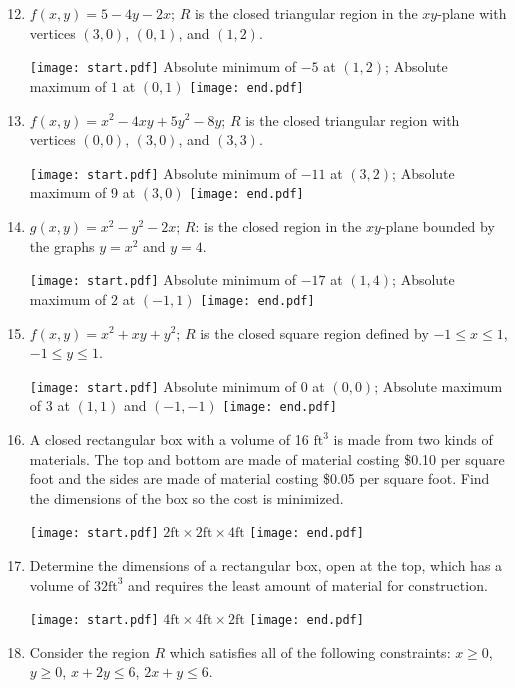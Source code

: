\documentclass[12pt]{article}
\begin{document}
\begin{enumerate}
\setcounter{enumi}{11}

\item $f(x,y)=5-4y-2x$; $R$ is the closed triangular region in the $xy$-plane with vertices $(3,0)$, $(0,1)$, and $(1,2)$. 

\texttt{[image: start.pdf]}
{{Absolute minimum of $-5$ at $(1,2)$; Absolute maximum of $1$ at $(0,1)$}}
\texttt{[image: end.pdf]}


\item $f(x,y)=x^2-4xy+5y^2-8y$; $R$ is the closed triangular region with vertices $(0,0)$, $(3,0)$, and $(3,3)$.

\texttt{[image: start.pdf]}
{{Absolute minimum of $-11$ at $(3,2)$; Absolute maximum of 9 at $(3,0)$}}
\texttt{[image: end.pdf]}


\item $g(x,y)=x^2-y^2-2x$; $R$: is the closed region in the $xy$-plane bounded by the graphs $y=x^2$ and $y=4$. 

\texttt{[image: start.pdf]}
{{Absolute minimum of $-17$ at $(1,4)$; Absolute maximum of $2$ at $(-1,1)$}}
\texttt{[image: end.pdf]}


\item $f(x,y)=x^2+xy+y^2$; $R$ is the closed square region defined by $-1 \leq x \leq 1$, $-1 \leq y \leq 1$.

\texttt{[image: start.pdf]}
{{Absolute minimum of 0 at $(0,0)$; Absolute maximum of 3 at $(1,1)$ and $(-1,-1)$}}
\texttt{[image: end.pdf]}


\item A closed rectangular box with a volume of 16 $\text{ft}^3$ is made from two kinds of materials.  The top and bottom are made of material costing \$0.10 per square foot and the sides are made of material costing \$0.05 per square foot.  Find the dimensions of the box so the cost is minimized.

\texttt{[image: start.pdf]}
{{$2\text{ft} \times 2\text{ft} \times 4\text{ft}$}}
\texttt{[image: end.pdf]}


\item Determine the dimensions of a rectangular box, open at the top, which has  a volume of $32 \text{ft}^3$ and requires the least amount of material for construction.

\texttt{[image: start.pdf]}
{{$4 \text{ft}\times 4\text{ft} \times 2 \text{ft}$}}
\texttt{[image: end.pdf]}


\item Consider the region $R$ which satisfies all of the following constraints: $x \geq 0$, $y \geq 0$, $x+2y \leq 6$, $2x+y\leq 6$.


\end{enumerate}
\end{document}
